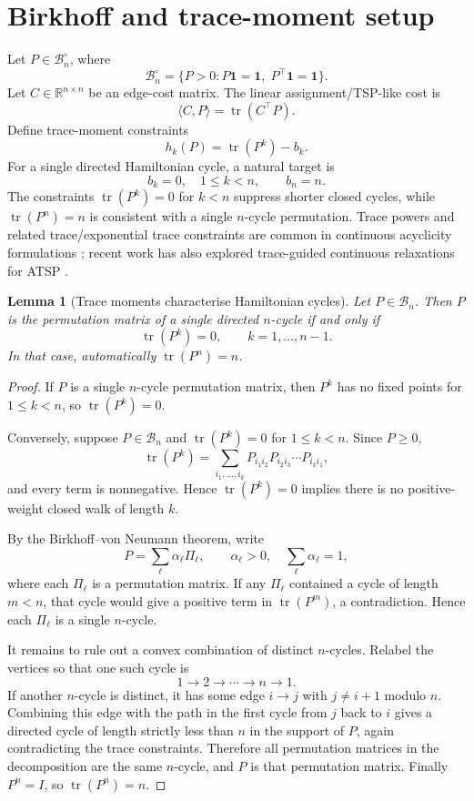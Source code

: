 \documentclass[11pt]{article}
\newtheorem{lemma}{Lemma}
\newcommand{\B}{\mathcal B}
\newcommand{\one}{\mathbf 1}
\newcommand{\tr}{\operatorname{tr}}
\newcommand{\R}{\mathbb R}
\begin{document}
\section{Birkhoff and trace-moment setup}

Let $P\in\B_n^\circ$, where
\[
    \B_n^\circ=\{P>0:P\one=\one,\;P^\top\one=\one\}.
\]
Let $C\in\R^{n\times n}$ be an edge-cost matrix. The linear assignment/TSP-like cost is
\[
    \langle C,P\rangle=\tr(C^\top P).
\]
Define trace-moment constraints
\[
    h_k(P)=\tr(P^k)-b_k.
\]
For a single directed Hamiltonian cycle, a natural target is
\[
    b_k=0,\quad 1\le k<n,\qquad b_n=n.
\]
The constraints $\tr(P^k)=0$ for $k<n$ suppress shorter closed cycles, while $\tr(P^n)=n$ is consistent with a single $n$-cycle permutation. Trace powers and related trace/exponential trace constraints are common in continuous acyclicity formulations \citep{zheng2018dags}; recent work has also explored trace-guided continuous relaxations for ATSP \citep{zhang2026solving}.

\begin{lemma}[Trace moments characterise Hamiltonian cycles]
Let $P\in\B_n$. Then $P$ is the permutation matrix of a single directed $n$-cycle if and only if
\[
    \tr(P^k)=0,\qquad k=1,\dots,n-1.
\]
In that case, automatically $\tr(P^n)=n$.
\end{lemma}

\begin{proof}
If $P$ is a single $n$-cycle permutation matrix, then $P^k$ has no fixed points for $1\le k<n$, so $\tr(P^k)=0$.

Conversely, suppose $P\in\B_n$ and $\tr(P^k)=0$ for $1\le k<n$. Since $P\ge0$,
\[
    \tr(P^k)=\sum_{i_1,\ldots,i_k}P_{i_1i_2}P_{i_2i_3}\cdots P_{i_ki_1},
\]
and every term is nonnegative. Hence $\tr(P^k)=0$ implies there is no positive-weight closed walk of length $k$.

By the Birkhoff--von Neumann theorem, write
\[
    P=\sum_\ell \alpha_\ell \Pi_\ell,\qquad \alpha_\ell>0,\quad \sum_\ell\alpha_\ell=1,
\]
where each $\Pi_\ell$ is a permutation matrix. If any $\Pi_\ell$ contained a cycle of length $m<n$, that cycle would give a positive term in $\tr(P^m)$, a contradiction. Hence each $\Pi_\ell$ is a single $n$-cycle.

It remains to rule out a convex combination of distinct $n$-cycles. Relabel the vertices so that one such cycle is
\[
    1\to2\to\cdots\to n\to1.
\]
If another $n$-cycle is distinct, it has some edge $i\to j$ with $j\ne i+1$ modulo $n$. Combining this edge with the path in the first cycle from $j$ back to $i$ gives a directed cycle of length strictly less than $n$ in the support of $P$, again contradicting the trace constraints. Therefore all permutation matrices in the decomposition are the same $n$-cycle, and $P$ is that permutation matrix. Finally $P^n=I$, so $\tr(P^n)=n$.
\end{proof}
\end{document}
